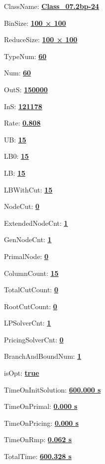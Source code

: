 \documentclass[11pt]{article}
\begin{document}
\pagestyle{empty}


ClassName: \underline{\textbf{Class_07.2bp-24}}
\par
BinSize: \underline{\textbf{100 × 100}}
\par
ReduceSize: \underline{\textbf{100 × 100}}
\par
TypeNum: \underline{\textbf{60}}
\par
Num: \underline{\textbf{60}}
\par
OutS: \underline{\textbf{150000}}
\par
InS: \underline{\textbf{121178}}
\par
Rate: \underline{\textbf{0.808}}
\par
UB: \underline{\textbf{15}}
\par
LB0: \underline{\textbf{15}}
\par
LB: \underline{\textbf{15}}
\par
LBWithCut: \underline{\textbf{15}}
\par
NodeCut: \underline{\textbf{0}}
\par
ExtendedNodeCnt: \underline{\textbf{1}}
\par
GenNodeCnt: \underline{\textbf{1}}
\par
PrimalNode: \underline{\textbf{0}}
\par
ColumnCount: \underline{\textbf{15}}
\par
TotalCutCount: \underline{\textbf{0}}
\par
RootCutCount: \underline{\textbf{0}}
\par
LPSolverCnt: \underline{\textbf{1}}
\par
PricingSolverCnt: \underline{\textbf{0}}
\par
BranchAndBoundNum: \underline{\textbf{1}}
\par
isOpt: \underline{\textbf{true}}
\par
TimeOnInitSolution: \underline{\textbf{600.000 s}}
\par
TimeOnPrimal: \underline{\textbf{0.000 s}}
\par
TimeOnPricing: \underline{\textbf{0.000 s}}
\par
TimeOnRmp: \underline{\textbf{0.062 s}}
\par
TotalTime: \underline{\textbf{600.328 s}}
\par
\newpage


\end{document}
